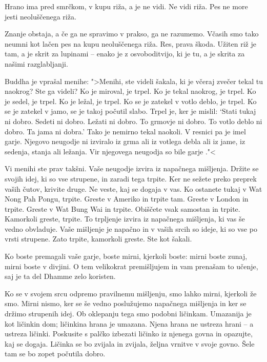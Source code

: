 Hrano ima pred smrčkom, v kupu riža, a je ne vidi. Ne vidi riža. Pes ne more jesti neoluščenega riža.

Znanje obstaja, a če ga ne spravimo v prakso, ga ne razumemo. Včasih smo tako neumni kot lačen pes na kupu neoluščenega riža. Res, prava škoda. Užiten riž je tam, a je skrit za lupinami – enako je z osvoboditvijo, ki je tu, a je skrita za našimi razglabljanji.

\clearpage


Buddha je vprašal menihe: ">Menihi, ste videli šakala, ki je včeraj zvečer tekal tu naokrog? Ste ga videli? Ko je miroval, je trpel. Ko je tekal naokrog, je trpel. Ko je sedel, je trpel. Ko je ležal, je trpel. Ko se je zatekel v votlo deblo, je trpel. Ko se je zatekel v jamo, se je takoj počutil slabo. Trpel je, ker je mislil: `Stati tukaj ni dobro. Sedeti ni dobro. Ležati ni dobro. To grmovje ni dobro. To votlo deblo ni dobro. Ta jama ni dobra.' Tako je nemirno tekal naokoli. V resnici pa je imel garje. Njegovo neugodje ni izviralo iz grma ali iz votlega debla ali iz jame, iz sedenja, stanja ali ležanja. Vir njegovega neugodja so bile garje ."<

Vi menihi ste prav takšni. Vaše neugodje izvira iz napačnega mišljenja. Držite se svojih idej, ki so vse strupene, in zaradi tega trpite. Ker ne sežete preko preprek vaših čutov, krivite druge. Ne veste, kaj se dogaja v vas. Ko ostanete tukaj v Wat Nong Pah Pongu, trpite. Greste v Ameriko in trpite tam. Greste v London in trpite. Greste v Wat Bung Wai in trpite. Obiščete vsak samostan in trpite. Kamorkoli greste, trpite. To trpljenje izvira iz napačnega mišljenja, ki vas še vedno obvladuje. Vaše mišljenje je napačno in v vaših srcih so ideje, ki so vse po vrsti strupene. Zato trpite, kamorkoli greste. Ste kot šakali.

Ko boste premagali vaše garje, boste mirni, kjerkoli boste: mirni boste zunaj, mirni boste v divjini. O tem velikokrat premišljujem in vam prenašam to učenje, saj je ta del Dhamme zelo koristen.

\enlargethispage{\baselineskip}

\clearpage


Ko se v svojem srcu odpremo pravilnemu mišljenju, smo lahko mirni, kjerkoli že smo. Mirni nismo, ker se še vedno poslužujemo napačnega mišljenja in ker se držimo strupenih idej. Ob oklepanju tega smo podobni ličinkam. Umazanija je kot ličinkin dom; ličinkina hrana je umazana. Njena hrana ne ustreza hrani – a ustreza ličinki. Poskusite s palčko izbezati ličinko iz njenega govna in opazujte, kaj se dogaja. Ličinka se bo zvijala in zvijala, željna vrnitve v svoje govno. Šele tam se bo zopet počutila dobro.

